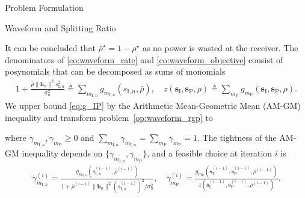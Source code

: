 \documentclass[journal,12pt,onecolumn,draftclsnofoot]{IEEEtran}
\begin{document}
\begin{section}{Problem Formulation}
\begin{subsection}{Waveform and Splitting Ratio}
\begin{mini!}
				\label{co:waveform_rate}
				\label{co:waveform_power}
				\label{co:waveform_splitting_ratio}
			\end{mini!}
			It can be concluded that $\bar{\rho}^{\star}=1-\rho^{\star}$ as no power is wasted at the receiver. The denominators of \eqref{co:waveform_rate} and \eqref{co:waveform_objective} consist of posynomials \cite{Boyd2007} that can be decomposed as sums of monomials
			\begin{align}
				1+\frac{\bar{\rho}\lVert{\boldsymbol{h}_n}\rVert^2 s_{\mathrm{I},n}^2}{\sigma_n^2} \triangleq \sum_{m_{\mathrm{I},n}}g_{m_{\mathrm{I},n}}(s_{\mathrm{I},n},\bar{\rho}), \quad z(\boldsymbol{s}_{\mathrm{I}},\boldsymbol{s}_\mathrm{P},\rho) \triangleq \sum_{m_\mathrm{P}}{g_{m_\mathrm{P}}(\boldsymbol{s}_{\mathrm{I}},\boldsymbol{s}_\mathrm{P},\rho)}\label{eq:g_IP}.
			\end{align}
			We upper bound \eqref{eq:g_IP} by the Arithmetic Mean-Geometric Mean (AM-GM) inequality \cite{Chiang2005} and transform problem~\eqref{op:waveform_rgp} to
			\begin{mini!}
				{}{}{\label{op:waveform_gp}}{}
			\end{mini!}
			where $\gamma_{m_{\mathrm{I},n}},\gamma_{m_\mathrm{P}} \ge 0$ and $\sum_{m_{\mathrm{I},n}}\gamma_{m_{\mathrm{I},n}}=\sum_{m_\mathrm{P}}\gamma_{m_\mathrm{P}}=1$. The tightness of the AM-GM inequality depends on $\{\gamma_{m_{\mathrm{I},n}},\gamma_{m_\mathrm{P}}\}$, and a feasible choice at iteration $i$ is
			\begin{align}
				\gamma_{m_{\mathrm{I},n}}^{(i)} = \frac{g_{m_{\mathrm{I},n}}(s_{\mathrm{I},n}^{(i-1)},\bar{\rho}^{(i-1)})}{1+{\bar{\rho}^{(i-1)}\lVert{\boldsymbol{h}_n}\rVert^2 (s_{\mathrm{I},n}^{(i-1)})^2}\big/{\sigma_n^2}}, \quad \gamma_{m_\mathrm{P}}^{(i)} = \frac{g_{m_\mathrm{P}}(\boldsymbol{s}_{\mathrm{I}}^{(i-1)},\boldsymbol{s}_\mathrm{P}^{(i-1)},\rho^{(i-1)})}{z(\boldsymbol{s}_{\mathrm{I}}^{(i-1)},\boldsymbol{s}_\mathrm{P}^{(i-1)},\rho^{(i-1)})}\label{eq:gamma_IP}.

\end{align}
\end{subsection}
\end{section}
\end{document}
